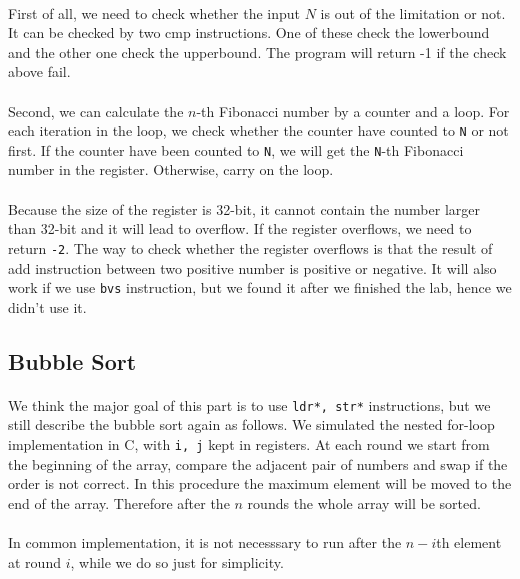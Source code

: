\paragraph{}
First of all, we need to check whether the input $N$ is out of the limitation or not. It can be checked by two cmp instructions. One of these check the lowerbound and the other one check the upperbound. The program will return -1 if the check above fail.
\paragraph{}
Second, we can calculate the $n$-th Fibonacci number by a counter and a loop. For each iteration in the loop, we check whether the counter have counted to \texttt{N} or not first. If the counter have been counted to \texttt{N}, we will get the \texttt{N}-th Fibonacci number in the register. Otherwise, carry on the loop.
\paragraph{}
Because the size of the register is 32-bit, it cannot contain the number larger than 32-bit and it will lead to overflow. If the register overflows, we need to return \texttt{-2}. The way to check whether the register overflows is that the result of add instruction between two positive number is positive or negative.
It will also work if we use \texttt{bvs} instruction, but we found it after we finished the lab, hence we didn't use it.


\subsection{Bubble Sort}
\paragraph{}
We think the major goal of this part is to use \texttt{ldr*, str*} instructions, but we still describe the bubble sort again as follows.
We simulated the nested for-loop implementation in C, with \texttt{i, j} kept in registers. At each round we start from the beginning of the array, compare the adjacent pair of numbers and swap if the order is not correct. In this procedure the maximum element will be moved to the end of the array. Therefore after the $n$ rounds the whole array will be sorted.
\paragraph{}
In common implementation, it is not necesssary to run after the $n-i$th element at round $i$, while we do so just for simplicity.
